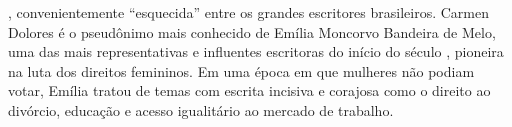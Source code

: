 , convenientemente “esquecida” entre os grandes escritores brasileiros. Carmen Dolores é o pseudônimo mais conhecido de Emília Moncorvo Bandeira de Melo, uma das mais representativas e influentes escritoras do início do século , pioneira na luta dos direitos femininos. Em uma época em que mulheres não podiam votar, Emília tratou de temas com escrita incisiva e corajosa como o direito ao divórcio, educação e acesso igualitário ao mercado de trabalho. 


\vfill

\hspace*{-.4cm}\begin{minipage}[c]{.5\linewidth}
\small{
{}}
\end{minipage}

\pagebreak
\pagestyle{imacat}

